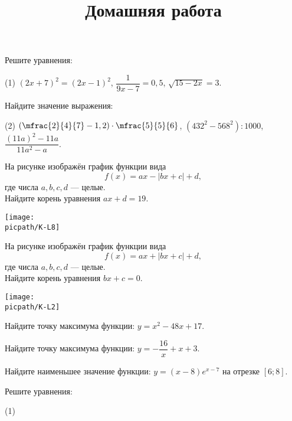 \begin{consultation}
	\begin{listofex}
		\item Решите уравнения:
		\begin{tasks}(1)
			\task \( (2x+7)^2=(2x-1)^2 \),
			\task \( \dfrac{1}{9x-7}=0,5 \),
			\task \( \sqrt{15-2x}=3 \).
		\end{tasks}
		\item Найдите значение выражения:
		\begin{tasks}(2)
			\task \( \left( \mfrac{2}{4}{7} - 1,2 \right) \cdot \mfrac{5}{5}{6} \),
			\task \( (432^2-568^2) : 1000 \),
			\task \( \dfrac{(11a)^2-11a}{11a^2-a} \).
		\end{tasks}
		\item
		\begin{minipage}[t]{\bodywidth}
			На рисунке изображён график функции вида \[ f(x)=ax-|bx+c|+d, \] где числа \(a, b, c, d\) --- целые.\\ Найдите корень уравнения \(ax+d=19\).
		\end{minipage}
		\hspace{0.02\linewidth}
		\begin{minipage}[t]{\picwidth}
			\texttt{[image: \\picpath/K-L8]}
		\end{minipage}
		\item
		\begin{minipage}[t]{\bodywidth}
			На рисунке изображён график функции вида \[ f(x)=ax+|bx+c|+d, \] где числа \(a, b, c, d\) --- целые.\\ Найдите корень уравнения \(bx+c=0\).
		\end{minipage}
		\hspace{0.02\linewidth}
		\begin{minipage}[t]{\picwidth}
			\texttt{[image: \\picpath/K-L2]}
		\end{minipage}
		\item Найдите точку максимума функции: \( y=x^2-48x+17 \).
		\item Найдите точку максимума функции: \( y = - \dfrac{16}{x}+x+3 \).
		\item Найдите наименьшее значение функции: \( y = (x-8)e^{x-7} \) на отрезке \( [6;8] \).
	\end{listofex}
	\newpage
	\title{Домашняя работа}
	\begin{listofex}
		\item Решите уравнения:
		\begin{tasks}(1)

\end{tasks}
\end{listofex}
\end{consultation}
